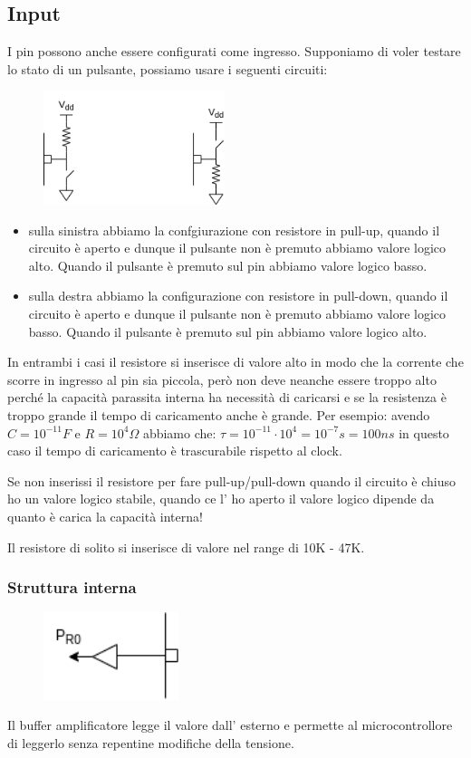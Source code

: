 \subsection{Input}
I pin possono anche essere configurati come ingresso.
Supponiamo di voler testare lo stato di un pulsante, possiamo usare i seguenti circuiti:
\begin{figure}[H]
    \centering
    \includegraphics[width=200px]{images/21_GPIO/pull-up_pull-down.drawio.png}
\end{figure}
\begin{itemize}
    \item sulla sinistra abbiamo la confgiurazione con resistore in pull-up, quando il circuito è aperto e dunque il pulsante non è premuto abbiamo valore logico alto.
    Quando il pulsante è premuto sul pin abbiamo valore logico basso.
    
    \item sulla destra abbiamo la configurazione con resistore in pull-down, quando il circuito è aperto e dunque il pulsante non è premuto abbiamo valore logico basso.
    Quando il pulsante è premuto sul pin abbiamo valore logico alto.
\end{itemize}
In entrambi i casi il resistore si inserisce di valore alto in modo che la corrente che scorre in ingresso al pin sia piccola, però non deve neanche essere troppo alto perché la capacità parassita interna ha necessità di caricarsi e se la resistenza è troppo grande il tempo di caricamento anche è grande.
Per esempio: avendo $C = 10^{-11}F$ e $R=10^4 \Omega$ abbiamo che: $\tau = 10^{-11} \cdot 10^{4} = 10^{-7}s = 100 ns$
in questo caso il tempo di caricamento è trascurabile rispetto al clock.

Se non inserissi il resistore per fare pull-up/pull-down quando il circuito è chiuso ho un valore logico stabile, quando ce l' ho aperto il valore logico dipende da quanto è carica la capacità interna!

Il resistore di solito si inserisce di valore nel range di 10K - 47K.

\subsubsection{Struttura interna}
\begin{figure}[H]
    \centering
    \includegraphics[width=150px]{images/21_GPIO/gpio_input_internals.drawio.png}
\end{figure}
Il buffer amplificatore legge il valore dall' esterno e permette al microcontrollore di leggerlo senza repentine modifiche della tensione.

